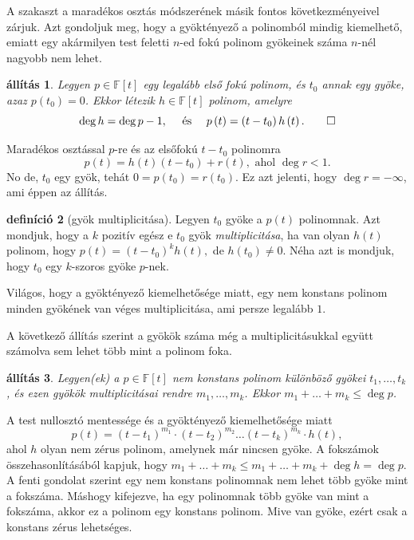 \documentclass[a4paper, showtrims]{memoir}
\makeatletter
\renewenvironment{proof}[1][\proofname]
    {\par\pushQED{\qed}%
    \normalfont \topsep6\p@\@plus6\p@\relax
    \trivlist
    \item[\hskip\labelsep
        \itshape
    #1\@addpunct{:}]\ignorespaces}
    {\popQED\endtrivlist\@endpefalse}
\theoremstyle{plain}
\newtheorem{proposition}{állítás}[chapter]
\theoremstyle{remark}
\theoremstyle{definition}
\newtheorem{definition}[proposition]{definíció}
\makeatother
\begin{document}
A szakaszt a maradékos osztás módszerének másik fontos következményeivel zárjuk.
Azt gondoljuk meg,
hogy a gyöktényező a polinomból mindig kiemelhető,
emiatt egy akármilyen test feletti $n$-ed fokú polinom gyökeinek száma $n$-nél nagyobb nem lehet.
\begin{proposition}
	Legyen $p\in\mathbb{F}\left[ t \right]$ egy legalább első fokú polinom,
	és $t_0$ annak egy gyöke, azaz $p\left( t_0 \right)=0$.
	Ekkor létezik $h\in\mathbb{F}\left[ t \right]$ polinom,
	amelyre
	\[
        \deg h = \deg p -1,
        \quad\text{ és }\quad
        p\left( t \right)=\left( t-t_0 \right)h\left( t \right).\qedhere
	\]
\end{proposition}
\begin{proof}
	Maradékos osztással $p$-re és az elsőfokú $t-t_0$ polinomra
	\[
		p\left( t \right)=h\left( t \right)\left( t-t_0 \right)+r\left( t \right),
		\text{ ahol }
		\deg r<1.
	\]
	No de, $t_0$ egy gyök, tehát $0=p\left( t_0 \right)=r\left( t_0 \right)$.
	Ez azt jelenti, hogy $\deg r=-\infty$, ami éppen az állítás.
\end{proof}
\begin{definition}[gyök multiplicitása]
	Legyen $t_0$ gyöke a $p\left( t \right)$ polinomnak.
	Azt mondjuk, hogy a $k$ pozitív egész e $t_0$ gyök \emph{multiplicitása},
	ha van olyan $h\left( t \right)$ polinom, hogy
	\begin{math}
		p\left( t \right)=\left( t-t_0 \right)^kh\left( t \right),
	\end{math}
	de $h\left( t_0 \right)\neq 0$.
	Néha azt is mondjuk, hogy $t_0$ egy $k$-szoros gyöke $p$-nek.
\end{definition}
Világos, hogy a gyöktényező kiemelhetősége miatt,
egy nem konstans polinom minden gyökének van véges multiplicitása, ami persze legalább $1$.

A következő állítás szerint a gyökök száma még a multiplicitásukkal együtt számolva sem lehet több mint a polinom foka.
\begin{proposition}
	Legyen(ek) a $p\in\mathbb{F}\left[ t \right]$ nem konstans polinom különböző gyökei $t_1,\ldots,t_k$,
	és ezen gyökök multiplicitásai rendre $m_1,\ldots,m_k$.
	Ekkor $m_1+\ldots+m_k\leq\deg p$.
\end{proposition}
\begin{proof}
	A test nullosztó mentessége és a gyöktényező kiemelhetősége miatt
	\[
		p\left( t \right)=
		\left( t-t_1 \right)^{m_1}\cdot\left( t-t_2 \right)^{m_2}\ldots\left( t-t_k \right)^{m_k}\cdot
		h\left( t \right),
	\]
	ahol $h$ olyan nem zérus polinom, amelynek már nincsen gyöke.
	A fokszámok összehasonlításából kapjuk, hogy
	$m_1+\ldots+m_k\leq m_1+\ldots+m_k+\deg h=\deg p$.
\end{proof}
A fenti gondolat szerint egy nem konstans polinomnak nem lehet több gyöke mint a fokszáma.
Máshogy kifejezve, ha egy polinomnak több gyöke van mint a fokszáma, akkor ez a polinom egy konstans polinom.
Mive van gyöke, ezért csak a konstans zérus lehetséges.
\end{document}
